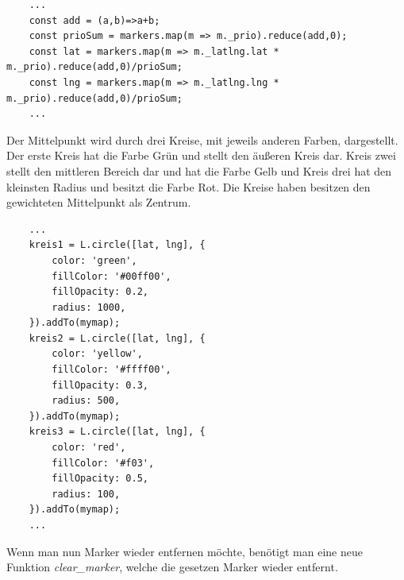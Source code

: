 \documentclass[a4paper, 12pt]{scrreprt}
\begin{document}
\begin{lstlisting}
	...
	const add = (a,b)=>a+b;
	const prioSum = markers.map(m => m._prio).reduce(add,0);
	const lat = markers.map(m => m._latlng.lat * m._prio).reduce(add,0)/prioSum;
	const lng = markers.map(m => m._latlng.lng * m._prio).reduce(add,0)/prioSum;
	...
\end{lstlisting}
Der Mittelpunkt wird durch drei Kreise, mit jeweils anderen Farben, dargestellt.
Der erste Kreis hat die Farbe Grün und stellt den äußeren Kreis dar.
Kreis zwei stellt den mittleren Bereich dar und hat die Farbe Gelb und Kreis drei hat den kleinsten Radius und besitzt die Farbe Rot.
Die Kreise haben besitzen den gewichteten Mittelpunkt als Zentrum.
\begin{lstlisting}
	...
	kreis1 = L.circle([lat, lng], {
		color: 'green',
		fillColor: '#00ff00',
		fillOpacity: 0.2,
		radius: 1000,
	}).addTo(mymap);
	kreis2 = L.circle([lat, lng], {
		color: 'yellow',
		fillColor: '#ffff00',
		fillOpacity: 0.3,
		radius: 500,
	}).addTo(mymap);
	kreis3 = L.circle([lat, lng], {
		color: 'red',
		fillColor: '#f03',
		fillOpacity: 0.5,
		radius: 100,
	}).addTo(mymap);
	...
\end{lstlisting}
Wenn man nun Marker wieder entfernen möchte, benötigt man eine neue Funktion \textit{clear\_marker}, welche die gesetzen Marker wieder entfernt.
\end{document}
